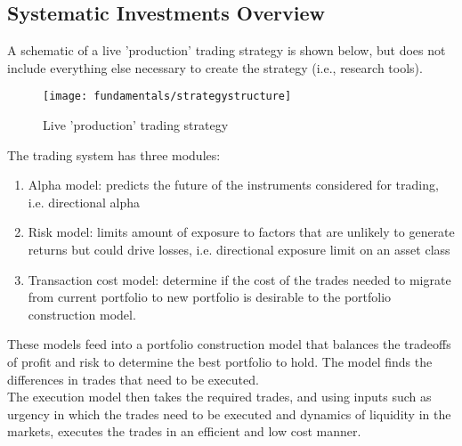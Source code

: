 \subsection{Systematic Investments Overview}

A schematic of a live 'production' trading strategy is shown below, but does not include everything else necessary to create the strategy (i.e., research tools).
\begin{figure}[H]
\centering
\texttt{[image: fundamentals/strategystructure]}
\caption{Live 'production' trading strategy}
\end{figure}
The trading system has three modules:
\begin{enumerate}[label=\roman*.]
\setlength{\itemsep}{0pt}
\item Alpha model: predicts the future of the instruments considered for trading, i.e. directional alpha
\item Risk model: limits amount of exposure to factors that are unlikely to generate returns but could drive losses, i.e. directional exposure limit on an asset class
\item Transaction cost model: determine if the cost of the trades needed to migrate from current portfolio to new portfolio is desirable to the portfolio construction model.
\end{enumerate}
These models feed into a portfolio construction model that balances the tradeoffs of profit and risk to determine the best portfolio to hold. The model finds the differences in trades that need to be executed.\\
The execution model then takes the required trades, and using inputs such as urgency in which the trades need to be executed and dynamics of liquidity in the markets, executes the trades in an efficient and low cost manner.\\


